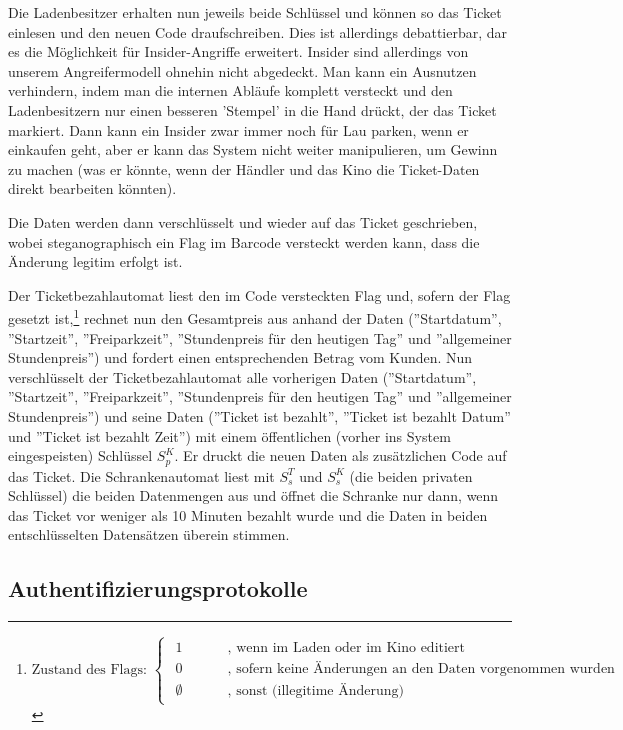 \documentclass{article}
\begin{document}
Die Ladenbesitzer erhalten nun jeweils beide Schlüssel und können so das Ticket einlesen und den neuen Code draufschreiben.
Dies ist allerdings debattierbar, dar es die Möglichkeit für Insider-Angriffe erweitert.
Insider sind allerdings von unserem Angreifermodell ohnehin nicht abgedeckt.
Man kann ein Ausnutzen verhindern, indem man die internen Abläufe komplett versteckt und den Ladenbesitzern nur einen besseren 'Stempel' in die Hand drückt, der das Ticket markiert.
Dann kann ein Insider zwar immer noch für Lau parken, wenn er einkaufen geht, aber er kann das System nicht weiter manipulieren, um Gewinn zu machen  (was er könnte, wenn der Händler und das Kino die Ticket-Daten direkt bearbeiten könnten).

Die Daten werden dann verschlüsselt und wieder auf das Ticket geschrieben, wobei steganographisch ein Flag im Barcode versteckt werden kann, dass die Änderung legitim erfolgt ist.

Der Ticketbezahlautomat liest den im Code versteckten Flag und, sofern der Flag gesetzt ist,\footnote{
		\[
			\text{Zustand des Flags: }\begin{cases}
				\begin{array}{ll}
					1~~~~~~~~~~~&\text{, wenn im Laden oder im Kino editiert}	\\
					0~~~~~~~~~~~&\text{, sofern keine Änderungen an den Daten vorgenommen wurden}	\\
					\emptyset	&\text{, sonst (illegitime Änderung)}
				\end{array}
			\end{cases}
		\]
} rechnet nun den Gesamtpreis aus anhand der Daten (''Startdatum'', ''Startzeit'', ''Freiparkzeit'', ''Stundenpreis für den heutigen Tag'' und ''allgemeiner Stundenpreis'') und fordert einen entsprechenden Betrag vom Kunden.
Nun verschlüsselt der Ticketbezahlautomat alle vorherigen Daten (''Startdatum'', ''Startzeit'', ''Freiparkzeit'', ''Stundenpreis für den heutigen Tag'' und ''allgemeiner Stundenpreis'') und seine Daten (''Ticket ist bezahlt'', ''Ticket ist bezahlt Datum'' und ''Ticket ist bezahlt Zeit'') mit einem öffentlichen (vorher ins System eingespeisten) Schlüssel $S_p^K$.
Er druckt die neuen Daten als zusätzlichen Code auf das Ticket.
Die Schrankenautomat liest mit $S_s^T$ und $S_s^K$ (die beiden privaten Schlüssel) die beiden Datenmengen aus und öffnet die Schranke nur dann, wenn das Ticket vor weniger als 10 Minuten bezahlt wurde und die Daten in beiden entschlüsselten Datensätzen überein stimmen.
\subsection{Authentifizierungsprotokolle}
\end{document}
